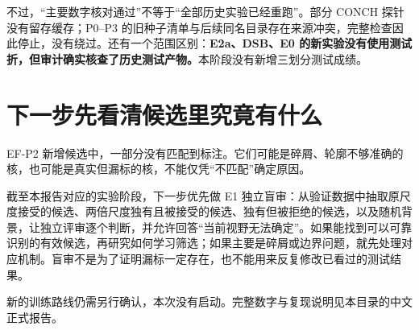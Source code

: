 \documentclass[12pt,a4paper]{article}
\begin{document}
不过，“主要数字核对通过”不等于“全部历史实验已经重跑”。部分 CONCH 探针没有留存缓存；P0--P3 的旧种子清单与后续同名目录存在来源冲突，完整检查因此停止，没有绕过。还有一个范围区别：\textbf{E2a、DSB、E0 的新实验没有使用测试折，但审计确实核查了历史测试产物。}本阶段没有新增三划分测试成绩。

\section*{下一步先看清候选里究竟有什么}

EF-P2 新增候选中，一部分没有匹配到标注。它们可能是碎屑、轮廓不够准确的核，也可能是真实但漏标的核，不能仅凭“不匹配”确定原因。

截至本报告对应的实验阶段，下一步优先做 E1 独立盲审：从验证数据中抽取原尺度接受的候选、两倍尺度独有且被接受的候选、独有但被拒绝的候选，以及随机背景，让独立评审逐个判断，并允许回答“当前视野无法确定”。如果能找到可以可靠识别的有效候选，再研究如何学习筛选；如果主要是碎屑或边界问题，就先处理对应机制。盲审不是为了证明漏标一定存在，也不能用来反复修改已看过的测试结果。

新的训练路线仍需另行确认，本次没有启动。完整数字与复现说明见本目录的中文正式报告。
\end{document}
